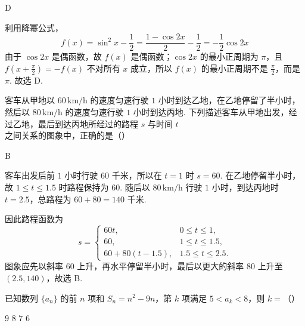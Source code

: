 \begin{answer}
D
\end{answer}

\begin{solution}
利用降幂公式，
\[
f(x)=\sin^2x-\frac12=\frac{1-\cos2x}{2}-\frac12=-\frac12\cos2x
\]
由于 \(\cos2x\) 是偶函数，故 \(f(x)\) 是偶函数；\(\cos2x\) 的最小正周期为 \(\pi\)，且 \(f(x+\frac{\pi}{2})=-f(x)\) 不对所有 \(x\) 成立，所以 \(f(x)\) 的最小正周期不是 \(\frac{\pi}{2}\)，而是 \(\pi\). 故选 D.
\end{solution}

\begin{problem}
客车从甲地以 \(60 \, \mathrm{km/h}\) 的速度匀速行驶 \(1\) 小时到达乙地，在乙地停留了半小时，然后以 \(80 \, \mathrm{km/h}\) 的速度匀速行驶 \(1\) 小时到达丙地. 下列描述客车从甲地出发，经过乙地，最后到达丙地所经过的路程 \(s\) 与时间 \(t\) 之间关系的图象中，正确的是（\quad）

    {}
    {}
    {}
\end{problem}

\begin{answer}
B
\end{answer}

\begin{solution}
客车出发后前 \(1\) 小时行驶 \(60\) 千米，所以在 \(t=1\) 时 \(s=60\). 在乙地停留半小时，故 \(1\leqslant t\leqslant1.5\) 时路程保持为 \(60\). 随后以 \(80\,\mathrm{km/h}\) 行驶 \(1\) 小时，到达丙地时 \(t=2.5\)，总路程为 \(60+80=140\) 千米.

因此路程函数为
\[
s=\begin{cases}
60t,&0\leqslant t\leqslant1,\\
60,&1\leqslant t\leqslant1.5,\\
60+80(t-1.5),&1.5\leqslant t\leqslant2.5.
\end{cases}
\]
图象应先以斜率 \(60\) 上升，再水平停留半小时，最后以更大的斜率 \(80\) 上升至 \((2.5,140)\)，故选 B.
\end{solution}

\begin{problem}
已知数列 \(\{a_{n}\}\) 的前 \(n\) 项和 \(S_{n} = n^{2} - 9n\)，第 \(k\) 项满足 \(5 < a_{k} < 8\)，则 \(k =\)（\quad）

\choices
    {\(9\)}
    {\(8\)}
    {\(7\)}
    {\(6\)}
\end{problem}

